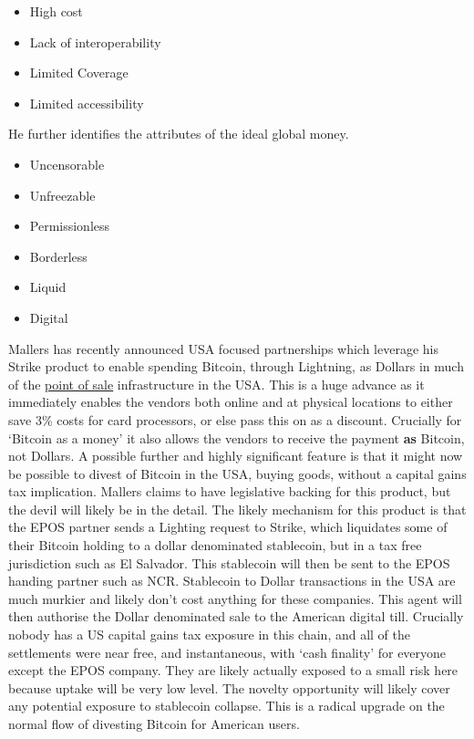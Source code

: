 \begin{itemize}
\begin{itemize}
\item High cost
\item Lack of interoperability
\item Limited Coverage
\item Limited accessibility
\end{itemize}
He further identifies the attributes of the ideal global money. 
\begin{itemize}
\item Uncensorable
\item Unfreezable
\item Permissionless
\item Borderless
\item Liquid
\item Digital
\end{itemize}
Mallers has recently announced USA focused partnerships which leverage his Strike product to enable spending Bitcoin, through Lightning, as Dollars in much of the \href{https://www.ncr.com/point-of-sale-pos-systems}{point of sale} infrastructure in the USA. This is a huge advance as it immediately enables the vendors both online and at physical locations to either save 3\% costs for card processors, or else pass this on as a discount. Crucially for `Bitcoin as a money' it also allows the vendors to receive the payment \textbf{as} Bitcoin, not Dollars. A possible further and highly significant feature is that it might now be possible to divest of Bitcoin in the USA, buying goods, without a capital gains tax implication. Mallers claims to have legislative backing for this product, but the devil will likely be in the detail. The likely mechanism for this product is that the EPOS partner sends a Lighting request to Strike, which liquidates some of their Bitcoin holding to a dollar denominated stablecoin, but in a tax free jurisdiction such as El Salvador. This stablecoin will then be sent to the EPOS handing partner such as NCR. Stablecoin to Dollar transactions in the USA are much murkier and likely don't cost anything for these companies. This agent will then authorise the Dollar denominated sale to the American digital till. Crucially nobody has a US capital gains tax exposure in this chain, and all of the settlements were near free, and instantaneous, with `cash finality' for everyone except the EPOS company. They are likely actually exposed to a small risk here because uptake will be very low level. The novelty opportunity will likely cover any potential exposure to stablecoin collapse. This is a radical upgrade on the normal flow of divesting Bitcoin for American users. \par

\end{itemize}
